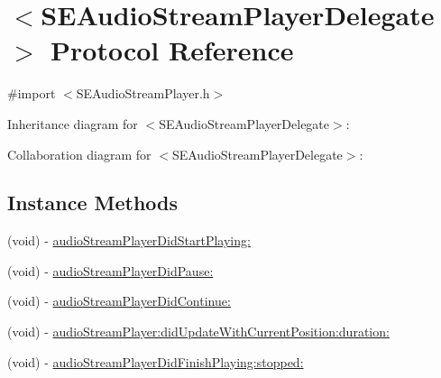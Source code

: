\hypertarget{protocol_s_e_audio_stream_player_delegate-p}{\section{$<$S\-E\-Audio\-Stream\-Player\-Delegate$>$ Protocol Reference}
\label{protocol_s_e_audio_stream_player_delegate-p}
}


{\ttfamily \#import $<$S\-E\-Audio\-Stream\-Player.\-h$>$}



Inheritance diagram for $<$S\-E\-Audio\-Stream\-Player\-Delegate$>$\-:


Collaboration diagram for $<$S\-E\-Audio\-Stream\-Player\-Delegate$>$\-:
\subsection*{Instance Methods}
\begin{DoxyCompactItemize}
\item 
(void) -\/ \hyperlink{protocol_s_e_audio_stream_player_delegate-p_a74bb3b4dcd45b0c79616eba1d11fdd02}{audio\-Stream\-Player\-Did\-Start\-Playing\-:}
\item 
(void) -\/ \hyperlink{protocol_s_e_audio_stream_player_delegate-p_a11ec4e64acd6d9a5bc84a94a314c4335}{audio\-Stream\-Player\-Did\-Pause\-:}
\item 
(void) -\/ \hyperlink{protocol_s_e_audio_stream_player_delegate-p_abbf414d9214d2bae34556952792fa8bc}{audio\-Stream\-Player\-Did\-Continue\-:}
\item 
(void) -\/ \hyperlink{protocol_s_e_audio_stream_player_delegate-p_a16a6ec647062ed75001f394ae08a1125}{audio\-Stream\-Player\-:did\-Update\-With\-Current\-Position\-:duration\-:}
\item 
(void) -\/ \hyperlink{protocol_s_e_audio_stream_player_delegate-p_afd0e13575d327b091285b6c7f44792d3}{audio\-Stream\-Player\-Did\-Finish\-Playing\-:stopped\-:}
\end{DoxyCompactItemize}


